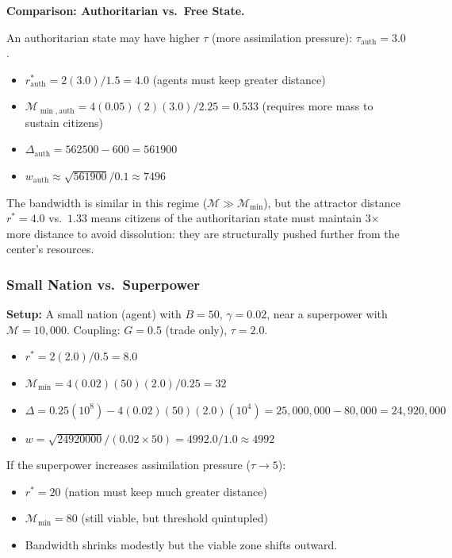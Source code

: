 \documentclass[11pt]{article}
\theoremstyle{plain}
\theoremstyle{definition}
\theoremstyle{remark}
\let\origsubsubsection\subsubsection
\renewcommand{\subsubsection}{\needspace{4\baselineskip}\origsubsubsection}
\providecommand{\tightlist}{%
  \setlength{\itemsep}{0pt}\setlength{\parskip}{0pt}}
\begin{document}
\textbf{Comparison: Authoritarian vs.~Free State.}

An authoritarian state may have higher \(\tau\) (more assimilation
pressure): \(\tau_{\text{auth}} = 3.0\).

\begin{itemize}
\tightlist
\item
  \(r^*_{\text{auth}} = 2(3.0)/1.5 = 4.0\) (agents must keep greater
  distance)
\item
  \(\mathcal{M}_{\min,\text{auth}} = 4(0.05)(2)(3.0)/2.25 = 0.533\)
  (requires more mass to sustain citizens)
\item
  \(\Delta_{\text{auth}} = 562500 - 600 = 561900\)
\item
  \(w_{\text{auth}} \approx \sqrt{561900}/0.1 \approx 7496\)
\end{itemize}

The bandwidth is similar in this regime
(\(\mathcal{M} \gg \mathcal{M}_{\min}\)), but the attractor distance
\(r^* = 4.0\) vs.~\(1.33\) means citizens of the authoritarian state
must maintain 3× more distance to avoid dissolution: they are
structurally pushed further from the center's resources.

\subsubsection{Small Nation
vs.~Superpower}\label{small-nation-vs.-superpower}

\textbf{Setup:} A small nation (agent) with \(B = 50\),
\(\gamma = 0.02\), near a superpower with \(\mathcal{M} = 10{,}000\).
Coupling: \(G = 0.5\) (trade only), \(\tau = 2.0\).

\begin{itemize}
\tightlist
\item
  \(r^* = 2(2.0)/0.5 = 8.0\)
\item
  \(\mathcal{M}_{\min} = 4(0.02)(50)(2.0)/0.25 = 32\)
\item
  \(\Delta = 0.25(10^8) - 4(0.02)(50)(2.0)(10^4) = 25{,}000{,}000 - 80{,}000 = 24{,}920{,}000\)
\item
  \(w = \sqrt{24920000}/(0.02 \times 50) = 4992.0/1.0 \approx 4992\)
\end{itemize}

If the superpower increases assimilation pressure (\(\tau \to 5\)):

\begin{itemize}
\tightlist
\item
  \(r^* = 20\) (nation must keep much greater distance)
\item
  \(\mathcal{M}_{\min} = 80\) (still viable, but threshold quintupled)
\item
  Bandwidth shrinks modestly but the viable zone shifts outward.
\end{itemize}
\end{document}
